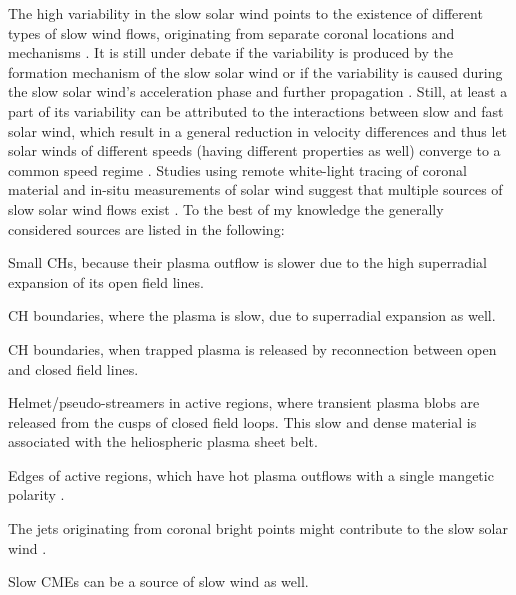 The high variability in the slow solar wind points to the existence of different types of slow wind flows, originating from separate coronal locations and mechanisms \citep{Schwenn1983}. It is still under debate if the variability is produced by the formation mechanism of the slow solar wind or if the variability is caused during the slow solar wind's acceleration phase and further propagation \citep{Sanchez-Diaz2016}. Still, at least a part of its variability can be attributed to the interactions between slow and fast solar wind, which result in a general reduction in velocity differences and thus let solar winds of different speeds (having different properties as well) converge to a common speed regime \citep{Sanchez-Diaz2016}. Studies using remote white-light tracing of coronal material and in-situ measurements of solar wind suggest that multiple sources of slow solar wind flows exist \citep{Wang2000,Kilpua2016}. To the best of my knowledge the generally considered sources are listed in the following:
\begin{itemize*}
	\item Small CHs, because their plasma outflow is slower due to the high superradial expansion of its open field lines.
	\item CH boundaries, where the plasma is slow, due to superradial expansion as well.
	\item CH boundaries, when trapped plasma is released by reconnection between open and closed field lines.
	\item Helmet/pseudo-streamers in active regions, where transient plasma blobs are released from the cusps of closed field loops. This slow and dense material is associated with the heliospheric plasma sheet belt.
	\item Edges of active regions, which have hot plasma outflows with a single mangetic polarity \citep{Kojima1999}.
	\item The jets originating from coronal bright points might contribute to the slow solar wind \citep{Subramanian2010}.
	\item Slow CMEs can be a source of slow wind as well.
\end{itemize*}

